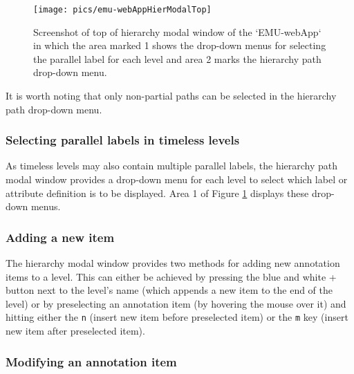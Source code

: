 \documentclass[]{book}
\begin{document}
\begin{figure}

{\centering \texttt{[image: pics/emu-webAppHierModalTop]} 

}

\caption{Screenshot of top of hierarchy modal window of the `EMU-webApp` in which the area marked 1 shows the drop-down menus for selecting the parallel label for each level and area 2 marks the hierarchy path drop-down menu.}\label{fig:webApp-hierModalTop}
\end{figure}

It is worth noting that only non-partial paths can be selected in the hierarchy path drop-down menu.

\hypertarget{selecting-parallel-labels-in-timeless-levels}{%
\subsubsection*{Selecting parallel labels in timeless levels}\label{selecting-parallel-labels-in-timeless-levels}}

As timeless levels may also contain multiple parallel labels, the hierarchy path modal window provides a drop-down menu for each level to select which label or attribute definition is to be displayed. Area 1 of Figure \ref{fig:webApp-hierModalTop} displays these drop-down menus.

\hypertarget{adding-a-new-item}{%
\subsubsection*{Adding a new item}\label{adding-a-new-item}}

The hierarchy modal window provides two methods for adding new annotation items to a level. This can either be achieved by pressing the blue and white + button next to the level's name (which appends a new item to the end of the level) or by preselecting an annotation item (by hovering the mouse over it) and hitting either the \texttt{n} (insert new item before preselected item) or the \texttt{m} key (insert new item after preselected item).

\hypertarget{modifying-an-annotation-item}{%
\subsubsection*{Modifying an annotation item}\label{modifying-an-annotation-item}}
\end{document}
